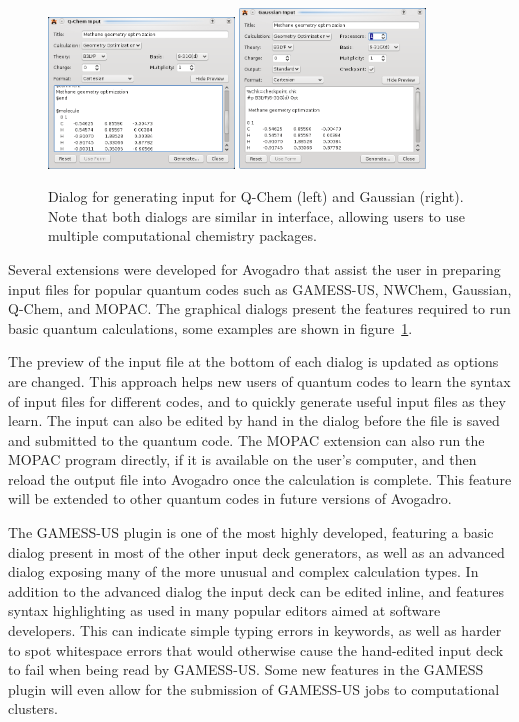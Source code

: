 \documentclass[10pt]{bmc_article}
\newenvironment{bmcformat}{\begin{raggedright}
\baselineskip20pt\sloppy\setboolean{publ}{false}}{\end{raggedright}
\baselineskip20pt\sloppy}
\begin{document}
\begin{bmcformat}
\begin{figure}
  \includegraphics[width=0.44\textwidth]{images/avogadro-q-chem}
  \hspace{0.1cm}
  \includegraphics[width=0.44\textwidth]{images/avogadro-gaussian}
  \caption{Dialog for generating input for Q-Chem (left) and Gaussian (right).
    Note that both dialogs are similar in interface, allowing users to use
    multiple computational chemistry packages.}
  \label{f:quantumdialogs}
\end{figure}

Several extensions were developed for Avogadro that assist the user in preparing
input files for popular quantum codes such as GAMESS-US, NWChem, Gaussian, Q-Chem, and
MOPAC. The graphical dialogs present the features required to run basic quantum
calculations, some examples are shown in figure~\ref{f:quantumdialogs}.

The preview of the input file at the bottom of each dialog is updated as options
are changed. This approach helps new users of quantum codes to learn the syntax
of input files for different codes, and to quickly generate useful input files
as they learn. The input can also be edited by hand in the dialog before the file is saved
and submitted to the quantum code. The MOPAC extension can also run the MOPAC
program directly, if it is available on the user's computer, and then reload the
output file into Avogadro once the calculation is complete. This
feature will be extended to other quantum codes in future versions of Avogadro.

The GAMESS-US plugin is one of the most highly developed, featuring a basic dialog
present in most of the other input deck generators, as well as an advanced dialog
exposing many of the more unusual and complex calculation types. In addition to
the advanced dialog the input deck can be edited inline, and features syntax
highlighting as used in many popular editors aimed at software developers. This
can indicate simple typing errors in keywords, as well as harder to spot whitespace
errors that would otherwise cause the hand-edited input deck to fail when being
read by GAMESS-US. Some new features in the GAMESS plugin will even allow
for the submission of GAMESS-US jobs to computational clusters.


\end{bmcformat}
\end{document}
